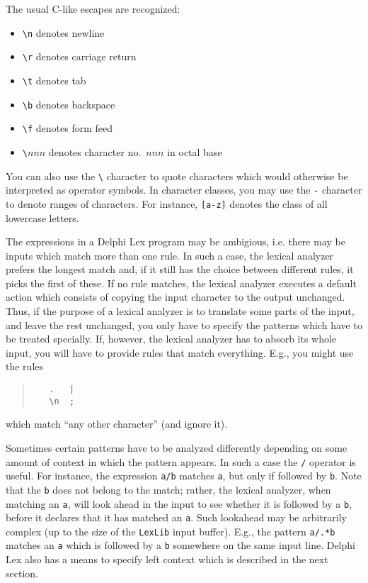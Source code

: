 \documentclass[a4paper]{article}
\begin{document}
The usual C-like escapes are recognized:
\begin{itemize}
   \item \verb"\n"     denotes newline
   \item \verb"\r"     denotes carriage return
   \item \verb"\t"     denotes tab
   \item \verb"\b"     denotes backspace
   \item \verb"\f"     denotes form feed
   \item \verb"\"$nnn$ denotes character no.\ $nnn$ in octal base
\end{itemize}

You can also use the \verb"\" character to quote characters which would
otherwise be interpreted as operator symbols. In character classes, you may
use the \verb"-" character to denote ranges of characters. For instance,
\verb"[a-z]" denotes the class of all lowercase letters.

The expressions in a Delphi Lex program may be ambigious, i.e. there may be inputs
which match more than one rule. In such a case, the lexical analyzer prefers
the longest match and, if it still has the choice between different rules,
it picks the first of these. If no rule matches, the lexical analyzer
executes a default action which consists of copying the input character
to the output unchanged. Thus, if the purpose of a lexical analyzer is
to translate some parts of the input, and leave the rest unchanged, you
only have to specify the patterns which have to be treated specially. If,
however, the lexical analyzer has to absorb its whole input, you will have
to provide rules that match everything. E.g., you might use the rules
\begin{quote}\begin{verbatim}
   .   |
   \n  ;
\end{verbatim}\end{quote}
which match ``any other character'' (and ignore it).

Sometimes certain patterns have to be analyzed differently depending on some
amount of context in which the pattern appears. In such a case the \verb"/"
operator is useful. For instance, the expression \verb"a/b" matches \verb"a",
but only if followed by \verb"b". Note that the \verb"b" does not belong to
the match; rather, the lexical analyzer, when matching an \verb"a", will look
ahead in the input to see whether it is followed by a \verb"b", before it
declares that it has matched an \verb"a". Such lookahead may be arbitrarily
complex (up to the size of the \verb"LexLib" input buffer). E.g., the pattern
\verb"a/.*b" matches an \verb"a" which is followed by a \verb"b" somewhere on
the same input line. Delphi Lex also has a means to specify left context which is
described in the next section.
\end{document}
